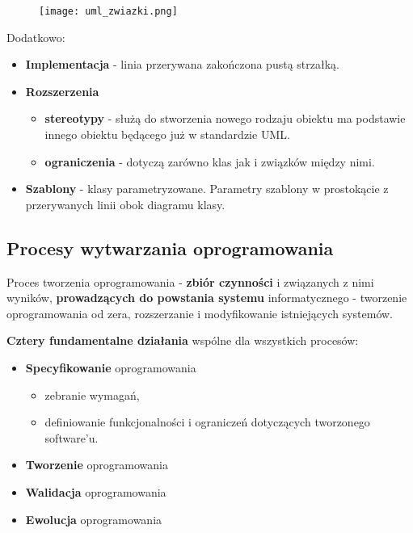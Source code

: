 \documentclass[a4paper]{article}
\begin{document}
    \begin{figure}[H]
        \texttt{[image: uml\_zwiazki.png]}
    \end{figure}

    Dodatkowo:
    \begin{itemize}
        \item \textbf{Implementacja} - linia przerywana
        zakończona pustą strzałką.
        \item \textbf{Rozszerzenia}
        \begin{itemize}
            \item \textbf{stereotypy} - służą do stworzenia nowego rodzaju obiektu ma podstawie innego obiektu
            będącego już w standardzie UML.
            \item \textbf{ograniczenia} - dotyczą zarówno klas jak i związków między nimi.
        \end{itemize}
        \item \textbf{Szablony} - klasy parametryzowane. Parametry szablony w prostokącie z przerywanych linii
        obok diagramu klasy.
    \end{itemize}


    \subsection{Procesy wytwarzania oprogramowania}
    Proces tworzenia oprogramowania - \textbf{zbiór czynności} i związanych z nimi wyników, \textbf{prowadzących do powstania
    systemu} informatycznego - tworzenie oprogramowania od zera, rozszerzanie i modyfikowanie istniejących systemów.

    \textbf{Cztery fundamentalne działania }wspólne dla wszystkich procesów:
    \begin{itemize}
        \item \textbf{Specyfikowanie} oprogramowania
        \begin{itemize}
            \item zebranie wymagań,
            \item definiowanie funkcjonalności i ograniczeń dotyczących
            tworzonego software’u.
        \end{itemize}
        \item \textbf{Tworzenie} oprogramowania
        \item \textbf{Walidacja} oprogramowania
        \item \textbf{Ewolucja} oprogramowania
    \end{itemize}
\end{document}
